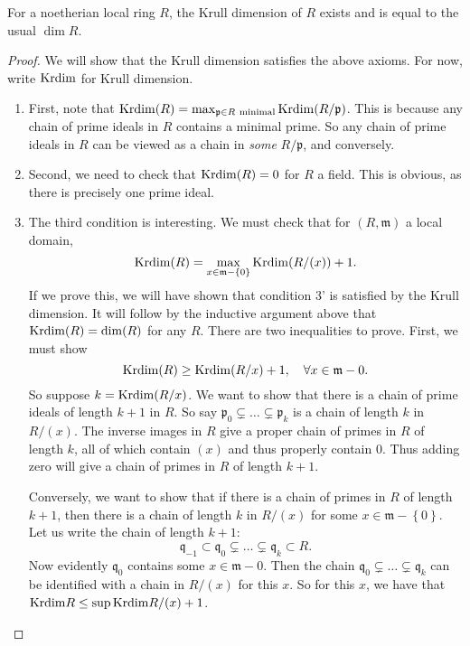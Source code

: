 \begin{theorem} 
For a noetherian local ring $R$, the Krull dimension of $R$ exists and is equal
to the usual $\dim R$.
\end{theorem}
\begin{proof} 
We will show that the Krull dimension satisfies the above axioms. For now,
write $\mathrm{Krdim}$ for Krull dimension.

\begin{enumerate}
\item First, note that $\mathrm{Krdim}(R) = \max_{\mathfrak{p} \in R \
\mathrm{minimal}}  \mathrm{Krdim}(R/\mathfrak{p})$. This is because any chain of prime
ideals in $R$ contains a minimal prime. So any chain of prime ideals in $R$ can
be viewed as a chain in \emph{some} $R/\mathfrak{p}$, and conversely.
\item Second, we need to check that $\mathrm{Krdim}(R) = 0$ for $R$ a field. This is
obvious, as there is precisely one prime ideal.
\item The third condition is interesting. We must check that for $(R,
\mathfrak{m})$ a local
domain, 
\[ \mathrm{Krdim}(R) = \max_{x \in \mathfrak{m} - \left\{0\right\}} \mathrm{Krdim}(R/(x)) + 1.  \]
If we prove this, we will have shown that condition 3' is satisfied by the
Krull dimension. It will follow by the inductive argument above that $\mathrm{Krdim}(R)
= \dim (R)$ for any $R$. 
There are two inequalities to prove. First, we must show
\[ \mathrm{Krdim}(R) \geq \mathrm{Krdim}(R/x) +1, \quad \forall x \in \mathfrak{m} - 0.  \]
So suppose $k = \mathrm{Krdim}(R/x)$. We want to show that there is a chain of prime
ideals of length $k+1$ in $R$. So say $\mathfrak{p}_0 \subsetneq \dots
\subsetneq \mathfrak{p}_k$ is a chain of length $k$ in $R/(x)$. The inverse
images in $R$ give a proper chain of primes in $R$ of  length $k$, all of which
contain $(x)$ and thus properly contain $0$. Thus adding zero will give a chain
of primes in $R$ of length $k+1$. 

Conversely, we want to show that if there is a chain of primes in $R$ of
length  $k+1$, then there is a chain of length $k$ in $R/(x)$ for some $x \in
\mathfrak{m} - \left\{0\right\}$. Let us write the chain  of length $k+1$:
\[ \mathfrak{q}_{-1} \subset \mathfrak{q}_0 \subsetneq \dots \subsetneq
\mathfrak{q}_k \subset R . \]
Now evidently $\mathfrak{q}_0$ contains some $x \in \mathfrak{m} - 0$. Then the
chain $\mathfrak{q}_0 \subsetneq \dots \subsetneq \mathfrak{q}_k$ can be
identified with a chain in $R/(x)$ for this $x$. So for this $x$, we have that
$\mathrm{Krdim} R \leq \sup \mathrm{Krdim} R/(x) + 1$.
\end{enumerate}
\end{proof} 

